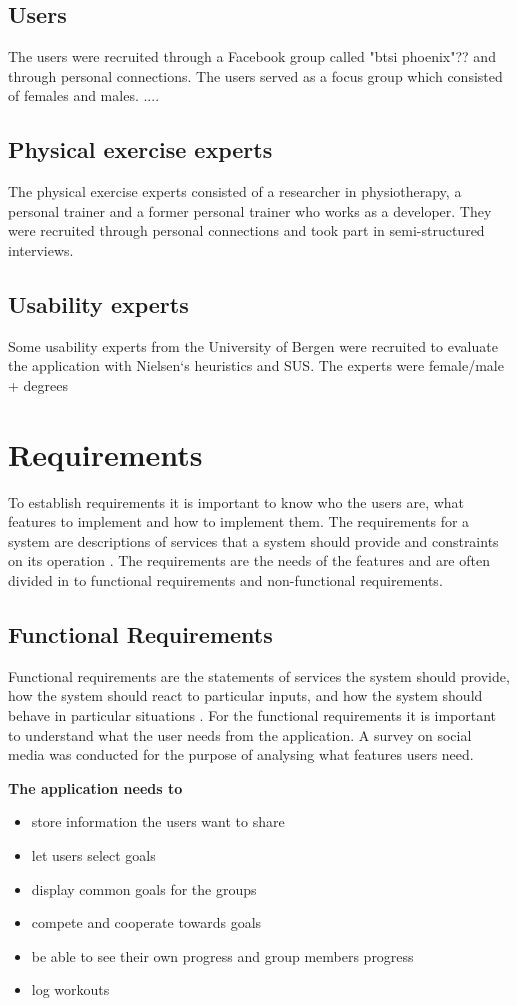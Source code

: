 \subsection{Users}
The users were recruited through a Facebook group called "btsi phoenix"?? and through personal connections. The users served as a focus group which consisted of females and males. ....
\subsection{Physical exercise experts}
The physical exercise experts consisted of a researcher in physiotherapy, a personal trainer and a former personal trainer who works as a developer. They were recruited through personal connections and took part in semi-structured interviews.
\subsection{Usability experts}
Some usability experts from the University of Bergen were recruited to evaluate the application with  Nielsen`s heuristics and SUS. The experts were female/male + degrees
\section{Requirements}
To establish requirements it is important to know who the users are, what features to implement and how to implement them. The requirements for a system are descriptions of services that a system should provide and constraints on its operation \cite{Sommerville:2010:SE:1841764}. The requirements are the needs of the features and are often divided in to functional requirements and non-functional requirements.
\subsection{Functional Requirements}
Functional requirements are the statements of services the system should provide, how the system should react to particular inputs, and how the system should behave in particular situations \cite{Sommerville:2010:SE:1841764}.
For the functional requirements it is important to understand what the user needs from the application. A survey on social media was conducted for the purpose of analysing what features users need.  

\textbf{The application needs to}
\begin{itemize}
\item store information the users want to share
\item let users select goals
\item display common goals for the groups
\item compete and cooperate towards goals
\item be able to see their own progress and group members progress
\item log workouts

\end{itemize}
    
